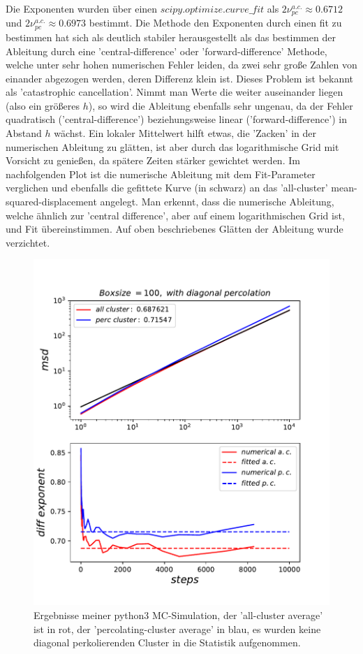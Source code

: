 \documentclass[a4paper, 12pt]{scrartcl}
\begin{document}
\vspace{0,5cm}
\newpage
\noindent Die Exponenten wurden über einen $scipy.optimize.curve\_fit$ als $2\nu_{pc}^{a.c.} \approx 0.6712$ und $2\nu_{pc}^{a.c.} \approx0.6973$ bestimmt. Die Methode den Exponenten durch einen fit zu bestimmen hat sich als deutlich stabiler herausgestellt als das bestimmen der Ableitung durch eine 'central-difference' oder 'forward-difference' Methode, welche unter sehr hohen numerischen Fehler leiden, da zwei sehr große Zahlen von einander abgezogen werden, deren Differenz klein ist. Dieses Problem ist bekannt als 'catastrophic cancellation'. Nimmt man Werte die weiter auseinander liegen (also ein größeres $h$), so wird die Ableitung ebenfalls sehr ungenau, da der Fehler quadratisch ('central-difference') beziehungsweise linear ('forward-difference') in Abstand $h$ wächst. Ein lokaler Mittelwert hilft etwas,
 die 'Zacken' in der numerischen Ableitung zu glätten, ist aber durch das logarithmische Grid mit Vorsicht zu genießen, da spätere Zeiten stärker gewichtet werden. Im nachfolgenden Plot ist die numerische Ableitung mit dem Fit-Parameter verglichen und ebenfalls die gefittete Kurve (in schwarz) an das 'all-cluster' mean-squared-displacement angelegt. Man erkennt, dass die numerische Ableitung, welche ähnlich zur 'central difference', aber auf einem logarithmischen Grid ist, und Fit übereinstimmen. Auf oben beschriebenes Glätten der Ableitung wurde verzichtet. 
\begin{figure}[h!]
	\centering
	\includegraphics[scale=0.9]{newacpc100.pdf}
	\caption{Ergebnisse meiner python3 MC-Simulation, der 'all-cluster average' ist in rot, der 'percolating-cluster average' in blau, es wurden keine diagonal perkolierenden Cluster in die Statistik aufgenommen.}
\end{figure}
\newpage
\end{document}
